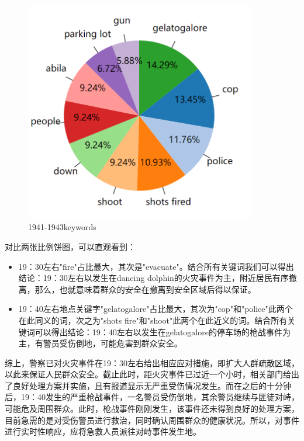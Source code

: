 \documentclass[a4paper]{article}
\begin{document}
\begin{figure}[H]
    \centering
    \includegraphics[width=0.9\textwidth]{images/3-7.png}
    \caption{1941-1943keywords}\label{fig:3-7}
    \vspace{\baselineskip}
\end{figure}
    
对比两张比例饼图，可以直观看到：
\begin{itemize}
    \item 19：30左右"fire"占比最大，其次是"evacuate"。结合所有关键词我们可以得出结论：19：30左右以发生在dancing dolphin的火灾事件为主，附近居民有序撤离，那么，也就意味着群众的安全在撤离到安全区域后得以保证。
    
    \item 19：40左右地点关键字"gelatogalore"占比最大，其次为"cop"和"police"此两个在此同义的词，次之为"shots fire"和"shoot"此两个在此近义的词。结合所有关键词可以得出结论：19：40左右以发生在gelatogalore的停车场的枪战事件为主，有警员受伤倒地，可能危害到群众安全。
\end{itemize}

综上，警察已对火灾事件在19：30左右给出相应应对措施，即扩大人群疏散区域，以此来保证人民群众安全。截止此时，距火灾事件已过近一个小时，相关部门给出了良好处理方案并实施，且有报道显示无严重受伤情况发生。而在之后的十分钟后，19：40发生的严重枪战事件，一名警员受伤倒地，其余警员继续与匪徒对峙，可能危及周围群众。此时，枪战事件刚刚发生，该事件还未得到良好的处理方案，目前急需的是对受伤警员进行救治，同时确认周围群众的健康状况。所以，对事件进行实时性响应，应将急救人员派往对峙事件发生地。
\end{document}
